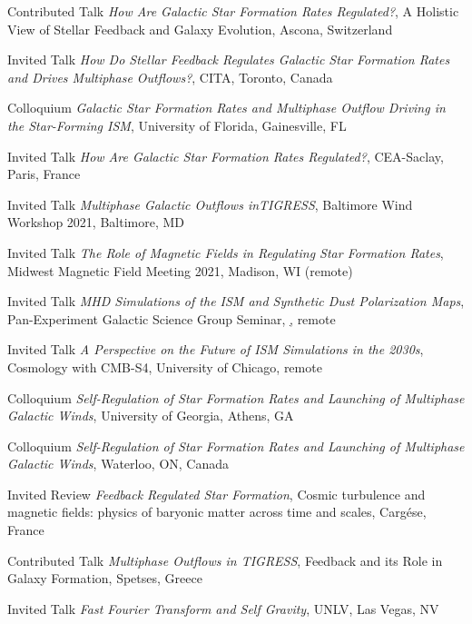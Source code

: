 \documentclass[12pt]{article}
\begin{document}
{Contributed Talk}
{\emph{How Are Galactic Star Formation Rates Regulated?},
A Holistic View of Stellar Feedback and Galaxy Evolution,
Ascona, Switzerland}

{Invited Talk}
{\emph{How Do Stellar Feedback Regulates Galactic Star Formation Rates and Drives Multiphase Outflows?},
CITA,
Toronto, Canada}

{Colloquium}
{\emph{Galactic Star Formation Rates and Multiphase Outflow Driving in the Star-Forming ISM},
University of Florida,
Gainesville, FL}

{Invited Talk}
{\emph{How Are Galactic Star Formation Rates Regulated?},
CEA-Saclay,
Paris, France}

{Invited Talk}
{\emph{Multiphase Galactic Outflows inTIGRESS},
Baltimore Wind Workshop 2021,
Baltimore, MD}

{Invited Talk}
{\emph{The Role of Magnetic Fields in Regulating Star Formation Rates},
Midwest Magnetic Field Meeting 2021,
Madison, WI (remote)}

{Invited Talk}
{\emph{MHD Simulations of the ISM and Synthetic Dust Polarization Maps},
Pan-Experiment Galactic Science Group Seminar,
\href{https://galsci.github.io}, remote}

{Invited Talk}
{\emph{A Perspective on the Future of ISM Simulations in the 2030s},
Cosmology with CMB-S4,
University of Chicago, remote}

{Colloquium}
{\emph{Self-Regulation of Star Formation Rates and Launching of Multiphase Galactic Winds},
University of Georgia,
Athens, GA}

{Colloquium}
{\emph{Self-Regulation of Star Formation Rates and Launching of Multiphase Galactic Winds},
Waterloo,
ON, Canada}

{Invited Review}
{\emph{Feedback Regulated Star Formation},
Cosmic turbulence and magnetic fields: physics of baryonic matter across time and scales,
Carg\'ese, France}

{Contributed Talk}
{\emph{Multiphase Outflows in TIGRESS},
Feedback and its Role in Galaxy Formation,
Spetses, Greece}

{Invited Talk}
{\emph{Fast Fourier Transform and Self Gravity},
UNLV,
Las Vegas, NV}
\end{document}
